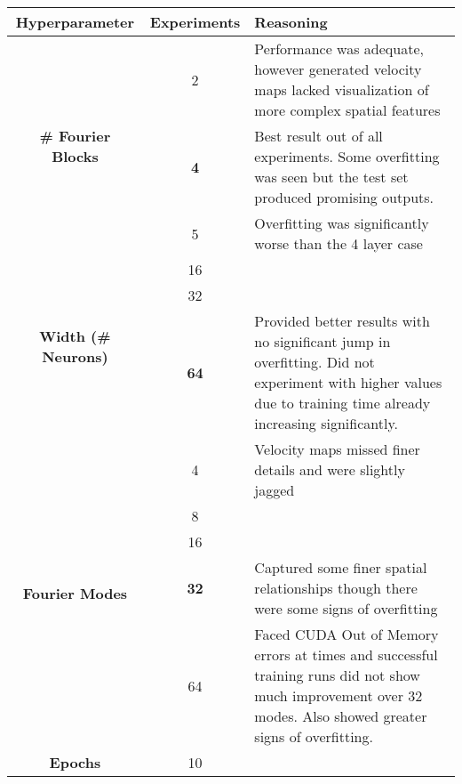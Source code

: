 \documentclass{article}
\begin{document}
\begin{center}
\begin{tabular}{|c|c|p{8cm}|}
\toprule
\textbf{Hyperparameter} & \textbf{Experiments} & \textbf{Reasoning} \\
\midrule

\multirow{3}{*}{\textbf{\# Fourier Blocks}} 

& 2 & Performance was adequate, however generated velocity maps lacked visualization of more complex spatial features\\

& \textbf{4} & Best result out of all experiments. Some overfitting was seen but the test set produced promising outputs.  \\

& 5 & Overfitting was significantly worse than the 4 layer case \\

\midrule

\multirow{3}{*}{\textbf{Width (\# Neurons)}} 

& 16 &  \\

& 32 &  \\

& \textbf{64} & Provided better results with no significant jump in overfitting. Did not experiment with higher values due to training time already increasing significantly.   \\

\midrule

\multirow{5}{*}{\textbf{Fourier Modes}} 

& 4 & Velocity maps missed finer details and were slightly jagged  \\

& 8 &  \\

& 16 &  \\

& \textbf{32} & Captured some finer spatial relationships though there were some signs of overfitting \\

& 64 & Faced CUDA Out of Memory errors at times and successful training runs did not show much improvement over 32 modes. Also showed greater signs of overfitting. \\

\midrule

\multirow{3}{*}{\textbf{Epochs}} 

& 10 &  \\


\end{tabular}
\end{center}
\end{document}

